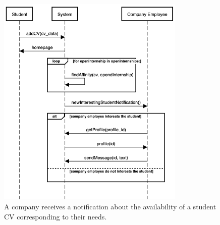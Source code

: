     \begin{figure}[H]
        \centering
        \includegraphics[width=0.8\textwidth]{RASD/Assets/SequenceDiagrams/6-matchmaking-new-student.png}
        \caption{A company receives a notification about the availability of a student CV corresponding to their needs.}
        \label{fig:A company receive a notification about the availability of a student CV corresponding to their needs}
    \end{figure}


